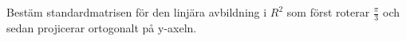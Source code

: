 Bestäm standardmatrisen för den linjära avbildning i $R^2$ som först roterar $\frac{\pi}{3}$ och sedan projicerar ortogonalt på y-axeln.